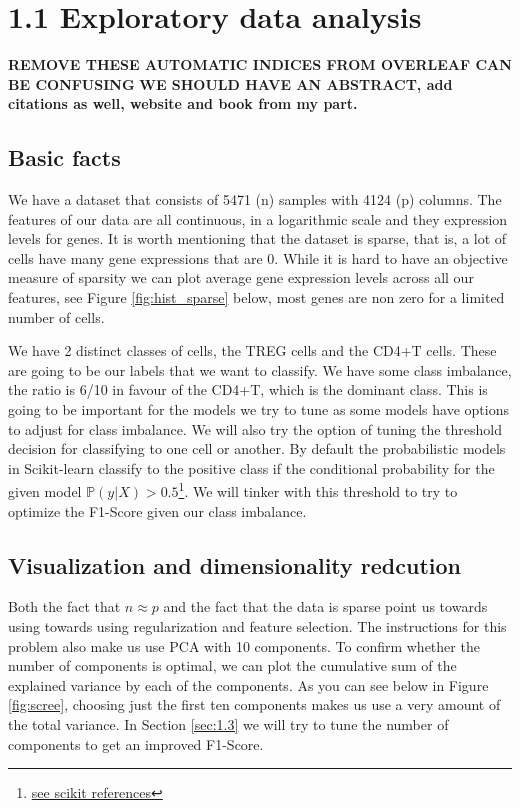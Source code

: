 \documentclass{article}
\begin{document}
\graphicspath{ {Figures/} }

\section{1.1 Exploratory data analysis}

\textbf{REMOVE THESE AUTOMATIC INDICES FROM OVERLEAF CAN BE CONFUSING}
\textbf{WE SHOULD HAVE AN ABSTRACT, add citations as well, website and book from my part.}


\subsection{Basic facts}
We have a dataset that consists of 5471 (n) samples with 4124 (p) columns. The features of our data are all continuous, in a logarithmic scale and they expression levels 
for genes. It is worth mentioning that the dataset is sparse, that is, a lot of cells have many gene expressions that are 0. While it is hard to have an objective measure
of sparsity we can plot average gene expression levels across all our features, see Figure \ref{fig:hist_sparse} below, most genes are non zero for a limited number of cells.



We have 2 distinct classes of cells, the TREG cells and the CD4+T cells. 
These are going to be our labels that we want to classify. We have some class imbalance, the ratio is 6/10 in favour of the CD4+T, 
which is the dominant class. This is going to be important for the models we try to tune as some models have options to adjust for class imbalance.
We will also try the option of tuning the threshold decision for classifying to one cell or another. By default the probabilistic models in Scikit-learn
classify to the positive class if the conditional probability for the given model $\mathbb{P}(\textit{y}|X) > 0.5$\footnote{\href{https://scikit-learn.org/1.5/modules/classification_threshold.html}{see scikit references}}. 
We will tinker with this threshold to try to optimize the F1-Score given our class imbalance.  

\subsection{Visualization and dimensionality redcution}

Both the fact that $n \approx p$ and the fact that the data is sparse point us towards using towards using regularization and feature selection.
The instructions for this problem also make us use PCA with 10 components. To confirm whether the number of components is optimal, we can plot the cumulative sum of the explained variance by each of the components.
As you can see below in Figure \ref{fig:scree}, choosing just the first ten components makes us use a very amount of the total variance.
In Section \ref{sec:1.3} we will try to tune the number of components to get an improved F1-Score.
\end{document}
